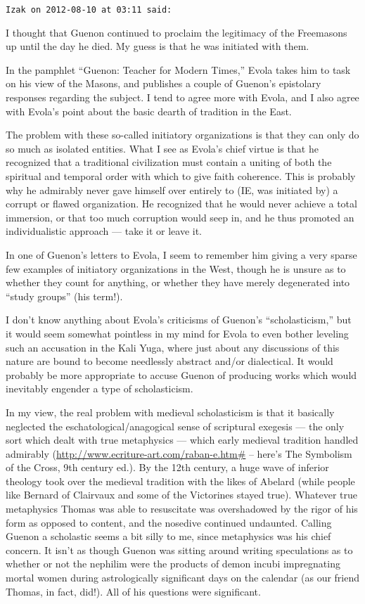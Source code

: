 \begin{footnotesize}
\begin{sffamily}
\hfill

\texttt{Izak on 2012-08-10 at 03:11 said:}

I thought that Guenon continued to proclaim the legitimacy of the Freemasons up until the day he died. My guess is that he was initiated with them.

In the pamphlet ``Guenon: Teacher for Modern Times,'' Evola takes him to task on his view of the Masons, and publishes a couple of Guenon's epistolary responses regarding the subject. I tend to agree more with Evola, and I also agree with Evola's point about the basic dearth of tradition in the East.

The problem with these so-called initiatory organizations is that they can only do so much as isolated entities. What I see as Evola's chief virtue is that he recognized that a traditional civilization must contain a uniting of both the spiritual and temporal order with which to give faith coherence. This is probably why he admirably never gave himself over entirely to (IE, was initiated by) a corrupt or flawed organization. He recognized that he would never achieve a total immersion, or that too much corruption would seep in, and he thus promoted an individualistic approach --- take it or leave it.

In one of Guenon's letters to Evola, I seem to remember him giving a very sparse few examples of initiatory organizations in the West, though he is unsure as to whether they count for anything, or whether they have merely degenerated into ``study groups'' (his term!).

I don't know anything about Evola's criticisms of Guenon's ``scholasticism,'' but it would seem somewhat pointless in my mind for Evola to even bother leveling such an accusation in the Kali Yuga, where just about any discussions of this nature are bound to become needlessly abstract and/or dialectical. It would probably be more appropriate to accuse Guenon of producing works which would inevitably engender a type of scholasticism.

In my view, the real problem with medieval scholasticism is that it basically neglected the eschatological/anagogical sense of scriptural exegesis --- the only sort which dealt with true metaphysics --- which early medieval tradition handled admirably (\url{http://www.ecriture-art.com/raban-e.htm\#} -- here's The Symbolism of the Cross, 9th century ed.). By the 12th century, a huge wave of inferior theology took over the medieval tradition with the likes of Abelard (while people like Bernard of Clairvaux and some of the Victorines stayed true). Whatever true metaphysics Thomas was able to resuscitate was overshadowed by the rigor of his form as opposed to content, and the nosedive continued undaunted. Calling Guenon a scholastic seems a bit silly to me, since metaphysics was his chief concern. It isn't as though Guenon was sitting around writing speculations as to whether or not the nephilim were the products of demon incubi impregnating mortal women during astrologically significant days on the calendar (as our friend Thomas, in fact, did!). All of his questions were significant.


\end{sffamily}
\end{footnotesize}
